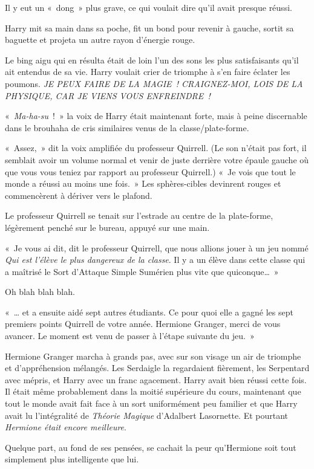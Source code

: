 Il y eut un «~dong~» plus grave, ce qui voulait dire qu'il avait presque réussi.

Harry mit sa main dans sa poche, fit un bond pour revenir à gauche, sortit sa baguette et projeta un autre rayon d'énergie rouge.

Le bing aigu qui en résulta était de loin l'un des sons les plus satisfaisants qu'il ait entendus de sa vie. Harry voulait crier de triomphe à s'en faire éclater les poumons. \emph{JE PEUX FAIRE DE LA MAGIE~! CRAIGNEZ-MOI, LOIS DE LA PHYSIQUE, CAR JE VIENS VOUS ENFREINDRE~!}

«~\emph{Ma-ha-su}~!~» la voix de Harry était maintenant forte, mais à peine discernable dans le brouhaha de cris similaires venus de la classe/plate-forme.

«~Assez,~» dit la voix amplifiée du professeur Quirrell. (Le son n'était pas fort, il semblait avoir un volume normal et venir de juste derrière votre épaule gauche où que vous vous teniez par rapport au professeur Quirrell.) «~Je vois que tout le monde a réussi au moins une fois.~» Les sphères-cibles devinrent rouges et commencèrent à dériver vers le plafond.

Le professeur Quirrell se tenait sur l'estrade au centre de la plate-forme, légèrement penché sur le bureau, appuyé sur une main.

«~Je vous ai dit, dit le professeur Quirrell, que nous allions jouer à un jeu nommé \emph{Qui est l'élève le plus dangereux de la classe}. Il y a un élève dans cette classe qui a maîtrisé le Sort d'Attaque Simple Sumérien plus vite que quiconque…~»

Oh blah blah blah.

«~… et a ensuite aidé sept autres étudiants. Ce pour quoi elle a gagné les sept premiers points Quirrell de votre année. Hermione Granger, merci de vous avancer. Le moment est venu de passer à l'étape suivante du jeu.~»

Hermione Granger marcha à grands pas, avec sur son visage un air de triomphe et d'appréhension mélangés. Les Serdaigle la regardaient fièrement, les Serpentard avec mépris, et Harry avec un franc agacement. Harry avait bien réussi cette fois. Il était même probablement dans la moitié supérieure du cours, maintenant que tout le monde avait fait face à un sort uniformément peu familier et que Harry avait lu l'intégralité de \emph{Théorie Magique} d'Adalbert Lasornette. Et pourtant \emph{Hermione était encore meilleure}.

Quelque part, au fond de ses pensées, se cachait la peur qu'Hermione soit tout simplement plus intelligente que lui.

